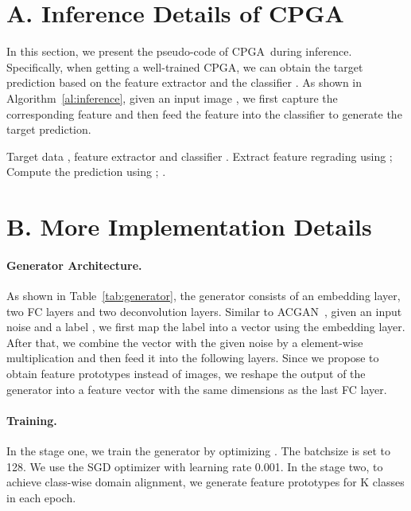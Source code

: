 \documentclass{article}
\def\ournet{CPGA}
\begin{document}
\section*{A. Inference Details of \ournet} \label{sec:inference}
In this section, we present the pseudo-code of \ournet~during inference. Specifically, when getting a well-trained \ournet, we can obtain the target prediction based on the feature extractor  and the classifier .
As shown in Algorithm~\ref{al:inference}, given an input image , we first capture the corresponding feature  and then feed the feature into the classifier  to generate the target prediction.


\begin{algorithm}
    \small
    \caption{Inference of \ournet}\label{al:inference}
    \begin{algorithmic}[1]
    \REQUIRE Target data , feature extractor  and classifier .
    \STATE Extract feature  regrading  using ;
    \STATE Compute the prediction  using ;
    \RETURN .
    \end{algorithmic}
\end{algorithm}




\section*{B. More Implementation Details} \label{sec:implement}

\paragraph{Generator Architecture.}

As shown in Table~\ref{tab:generator}, the generator consists of an embedding layer, two FC layers and two deconvolution layers. 
Similar to ACGAN~\cite{odena2017conditional}, given an input noise  and a label , we first map the label into a vector using the embedding layer. After that, we combine the vector with the given noise by a element-wise multiplication and then feed it into the following layers.
Since we propose to obtain feature prototypes instead of images, we reshape the output of the generator into a feature vector with the same dimensions as the last FC layer.


\paragraph{Training.}

In the stage one, we train the generator by optimizing .
The batchsize is set to 128.
We use the SGD optimizer with learning rate  0.001.
In the stage two, to achieve class-wise domain alignment, we generate feature prototypes for K classes in each epoch. 
\end{document}
